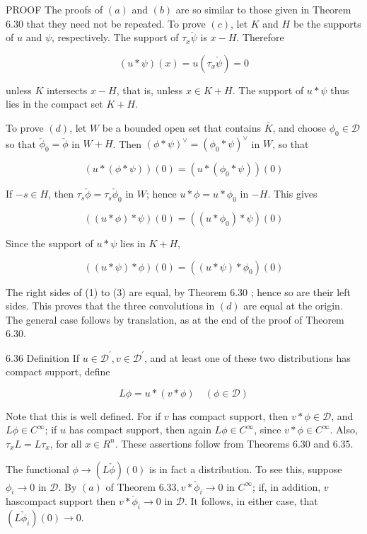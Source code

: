 \documentclass[10pt]{article}
\begin{document}
PROOF The proofs of $(a)$ and $(b)$ are so similar to those given in Theorem 6.30 that they need not be repeated. To prove $(c)$, let $K$ and $H$ be the supports of $u$ and $\psi$, respectively. The support of $\tau_{x} \check{\psi}$ is $x-H$. Therefore

$$
(u * \psi)(x)=u\left(\tau_{x} \check{\psi}\right)=0
$$

unless $K$ intersects $x-H$, that is, unless $x \in K+H$. The support of $u * \psi$ thus lies in the compact set $K+H$.

To prove $(d)$, let $W$ be a bounded open set that contains $\bar{K}$, and choose $\phi_{0} \in \mathscr{D}$ so that $\check{\phi}_{0}=\check{\phi}$ in $W+H$. Then $(\phi * \psi)^{\vee}=\left(\phi_{0} * \psi\right)^{\vee}$ in $W$, so that

$$
(u *(\phi * \psi))(0)=\left(u *\left(\phi_{0} * \psi\right)\right)(0)
$$

If $-s \in H$, then $\tau_{s} \check{\phi}=\tau_{s} \check{\phi}_{0}$ in $W$; hence $u * \phi=u * \phi_{0}$ in $-H$. This gives

$$
((u * \phi) * \psi)(0)=\left(\left(u * \phi_{0}\right) * \psi\right)(0)
$$

Since the support of $u * \psi$ lies in $K+H$,

$$
((u * \psi) * \phi)(0)=\left((u * \psi) * \phi_{0}\right)(0)
$$

The right sides of (1) to (3) are equal, by Theorem 6.30 ; hence so are their left sides. This proves that the three convolutions in $(d)$ are equal at the origin. The general case follows by translation, as at the end of the proof of Theorem 6.30.

6.36 Definition If $u \in \mathscr{D}^{\prime}, v \in \mathscr{D}^{\prime}$, and at least one of these two distributions has compact support, define

$$
L \phi=u *(v * \phi) \quad(\phi \in \mathscr{D})
$$

Note that this is well defined. For if $v$ has compact support, then $v * \phi \in \mathscr{D}$, and $L \phi \in C^{\infty}$; if $u$ has compact support, then again $L \phi \in C^{\infty}$, since $v * \phi \in C^{\infty}$. Also, $\tau_{x} L=L \tau_{x}$, for all $x \in R^{n}$. These assertions follow from Theorems 6.30 and 6.35.

The functional $\phi \rightarrow(L \check{\phi})(0)$ is in fact a distribution. To see this, suppose $\phi_{i} \rightarrow 0$ in $\mathscr{D}$. By $(a)$ of Theorem $6.33, v * \check{\phi}_{i} \rightarrow 0$ in $C^{\infty}$; if, in addition, $v$ hascompact support then $v * \check{\phi}_{i} \rightarrow 0$ in $\mathscr{D}$. It follows, in either case, that $\left(L \check{\phi}_{i}\right)(0) \rightarrow 0$.
\end{document}
